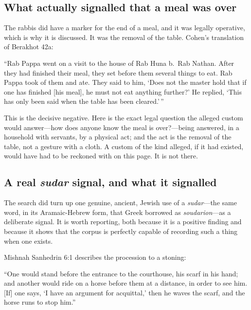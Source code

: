 \subsection{What actually signalled that a meal was over}

The rabbis did have a marker for the end of a meal, and it was legally
operative, which is why it is discussed. It was the removal of the table.
Cohen's translation of Berakhot 42a:

\begin{studyframe}\small
``Rab Pappa went on a visit to the house of Rab Huna b.\ Rab Nathan. After they
had finished their meal, they set before them several things to eat. Rab Pappa
took of them and ate. They said to him, `Does not the master hold that if one
has finished [his meal], he must not eat anything further?' He replied, `This
has only been said when the table has been cleared.'\,''
\end{studyframe}

This is the decisive negative. Here is the exact legal question the alleged
custom would answer---how does anyone know the meal is over?---being answered,
in a household with servants, by a physical act; and the act is the removal of
the table, not a gesture with a cloth. A custom of the kind alleged, if it had
existed, would have had to be reckoned with on this page. It is not there.

\subsection{A real \emph{sudar} signal, and what it signalled}

The search did turn up one genuine, ancient, Jewish use of a \emph{sudar}---the
same word, in its Aramaic-Hebrew form, that Greek borrowed as
\emph{soudarion}---as a deliberate signal. It is worth reporting, both because
it is a positive finding and because it shows that the corpus is perfectly
capable of recording such a thing when one exists.

Mishnah Sanhedrin 6:1 describes the procession to a stoning:

\begin{studyframe}\small
``One would stand before the entrance to the courthouse, his scarf in his hand;
and another would ride on a horse before them at a distance, in order to see
him. [If] one says, `I have an argument for acquittal,' then he waves the
scarf, and the horse runs to stop him.''
\end{studyframe}

